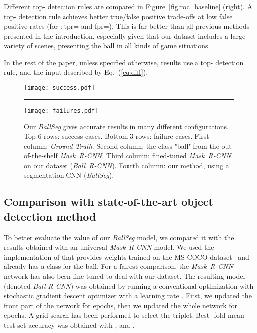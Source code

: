 \documentclass[sigconf, screen]{acmart}
\begin{document}
Different top- detection rules are compared in Figure~\ref{fig:roc_baseline} (right). A top- detection rule achieves better true/false positive trade-offs at low false positive rates (for : {\sc tpr}= and {\sc fpr}=). This is far better than all previous methods presented in the introduction, especially given that our dataset includes a large variety of scenes, presenting the ball in all kinds of game situations.

In the rest of the paper, unless specified otherwise, results use a top- detection rule, and the input described by Eq.~(\ref{eq:diff}).


\begin{figure*}
    \begin{center}
    \texttt{[image: success.pdf]}
    \hrule
    \texttt{[image: failures.pdf]}
    \end{center}
    \vspace{-10pt}
    \caption{Our \emph{BallSeg} gives accurate results in many different configurations. Top 6 rows: success cases. Bottom 3 rows: failure cases. First column: \emph{Ground-Truth}. Second column: the class "ball" from the out-of-the-shelf \emph{Mask~R-CNN}. Third column: fined-tuned \emph{Mask~R-CNN} on our dataset (\emph{Ball~R-CNN}). Fourth column: our method, using a segmentation CNN (\emph{BallSeg}).}
    \label{fig:results}
\end{figure*}

\subsection{Comparison with state-of-the-art object detection method}
\label{subsec:compare}

To better evaluate the value of our \emph{BallSeg} model, we compared it with the results obtained with an universal \emph{Mask~R-CNN} model. We used the implementation of \cite{matterport_maskrcnn_2017} that provides weights trained on the MS-COCO dataset~\cite{coco} and already has a class for the ball.
For a fairest comparison, the \emph{Mask~R-CNN} network has also been fine tuned to deal with our dataset. The resulting model (denoted \emph{Ball R-CNN}) was obtained by running a conventional optimization with stochastic gradient descent optimizer with a learning rate . First, we updated the front part of the network for  epochs, then we updated the whole network for  epochs. A grid search has been performed to select the  triplet. Best -fold mean test set accuracy was obtained with ,  and .
\end{document}
